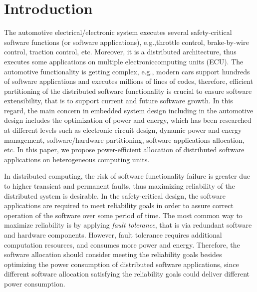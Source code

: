 \section{Introduction}
The automotive electrical/electronic system executes several safety-critical software functions (or software applications), e.g.,throttle control, brake-by-wire control, traction control, etc. Moreover, it is a distributed architecture, thus executes some applications on multiple electroniccomputing units (ECU). The automotive functionality is getting complex, e.g., modern cars support hundreds of software applications and executes millions of lines of codes, therefore, efficient partitioning of the distributed software functionality is crucial to ensure software extensibility, that is to support current and future software growth. In this regard, the main concern in embedded system design including in the automotive design includes the optimization of power and energy, which has been researched at different levels such as electronic circuit design, dynamic power and energy management, software/hardware partitioning, software applications allocation, etc. In this paper, we propose power-efficient allocation of distributed software applications on heterogeneous computing units.

In distributed computing, the risk of software functionality failure is greater due to higher transient and permanent faults, thus maximizing reliability of the distributed system is desirable. In the safety-critical design, the software applications are required to meet reliability goals in order to assure correct operation of the software over some period of time. The most common way to maximize reliability is by applying \textit{fault tolerance}, that is via redundant software and hardware components. However, fault tolerance requires additional computation resources, and consumes more power and energy. Therefore, the software allocation should consider meeting the reliability goals besides optimizing the power consumption of distributed software applications, since different software allocation satisfying the reliability goals could deliver different power consumption.

